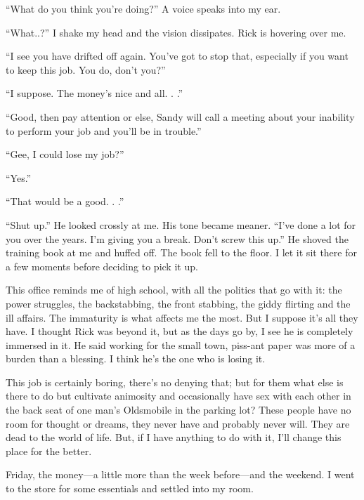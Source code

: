 ``What do you think you're doing?'' A voice speaks into my ear.

``What..?'' I shake my head and the vision dissipates. Rick is hovering
over me.

``I see you have drifted off again. You've got to stop that, especially
if you want to keep this job. You do, don't you?''

``I suppose. The money's nice and all. . .''

``Good, then pay attention or else, Sandy will call a meeting about your
inability to perform your job and you'll be in trouble.''

``Gee, I could lose my job?''

``Yes.''

``That would be a good. . .''

``Shut up.'' He looked crossly at me. His tone became meaner. ``I've
done a lot for you over the years. I'm giving you a break. Don't screw
this up.'' He shoved the training book at me and huffed off. The book
fell to the floor. I let it sit there for a few moments before deciding
to pick it up.

This office reminds me of high school, with all the politics that go
with it: the power struggles, the backstabbing, the front stabbing, the
giddy flirting and the ill affairs. The immaturity is what affects me
the most. But I suppose it's all they have. I thought Rick was beyond
it, but as the days go by, I see he is completely immersed in it. He
said working for the small town, piss-ant paper was more of a burden
than a blessing. I think he's the one who is losing it.

This job is certainly boring, there's no denying that; but for them what
else is there to do but cultivate animosity and occasionally have sex
with each other in the back seat of one man's Oldsmobile in the parking
lot? These people have no room for thought or dreams, they never have
and probably never will. They are dead to the world of life. But, if I
have anything to do with it, I'll change this place for the better.

Friday, the money---a little more than the week before---and the
weekend. I went to the store for some essentials and settled into my
room.

